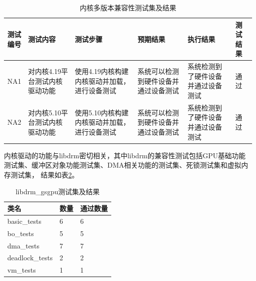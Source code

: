 \begin{table}[H]
  \centering
  \caption{内核多版本兼容性测试集及结果}
  \label{tab:内核多版本兼容性测试集及结果}
  \begin{tabular}{lp{3cm}p{3cm}p{2cm}p{2cm}l}
    \toprule
    \makecell[l]{测试\\编号} & 测试内容  &  测试步骤  & 预期结果 & 执行结果 & 测试结果\\
    \midrule
    NA1 & 对内核4.19平台测试内核驱动功能 & 使用4.19内核构建内核驱动并加载，进行设备测试 & 系统可以检测到硬件设备并通过设备测试 & 系统检测到了硬件设备并通过设备测试 & 通过\\
    NA2 & 对内核5.10平台测试内核驱动功能 & 使用5.10内核构建内核驱动并加载，进行设备测试 & 系统可以检测到硬件设备并通过设备测试 & 系统检测到了硬件设备并通过设备测试 & 通过\\
    \bottomrule
  \end{tabular}
  \note{}
\end{table}

内核驱动的功能与libdrm密切相关，其中libdrm的兼容性测试包括GPU基础功能测试集、缓冲区对象功能测试集、DMA相关功能的测试集、死锁测试集和虚拟内存测试集，
结果如表\ref{tab:libdrm_gsgpu测试集}。







\begin{table}[H]
    \centering
    \caption{libdrm\_gsgpu测试集及结果}
    \label{tab:libdrm_gsgpu测试集}
    \begin{tabular}{lll}
      \toprule
      类名   &  数量  &通过数量\\
      \midrule
      basic\_tests & 6 & 6\\
      bo\_tests & 5 & 5\\
      dma\_tests & 7 & 7\\
      deadlock\_tests & 2 &2\\
      vm\_tests & 1 &1\\
      \bottomrule
    \end{tabular}
    \note{}
\end{table}

